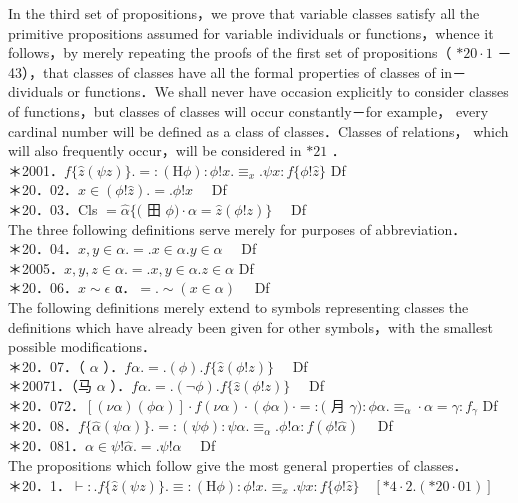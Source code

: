 \documentclass[10pt]{article}
\begin{document}
In the third set of propositions，we prove that variable classes satisfy all the primitive propositions assumed for variable individuals or functions，whence it follows，by merely repeating the proofs of the first set of propositions（ $* 20 \cdot 1$ －43），that classes of classes have all the formal properties of classes of in－ dividuals or functions．We shall never have occasion explicitly to consider classes of functions，but classes of classes will occur constantly－for example， every cardinal number will be defined as a class of classes．Classes of relations， which will also frequently occur，will be considered in $* 21$ ．\\
＊2001．$f\{\hat{z}(\psi z)\} .=:(\mathrm{H} \phi): \phi!x . \equiv_{x} . \psi x: f\{\phi!\hat{z}\}$ Df\\
＊20．02．$x \in(\phi!\hat{z}) .=. \phi!x \quad$ Df\\
＊20．03．Cls $=\hat{\alpha}\{($ 田 $\phi) \cdot \alpha=\hat{z}(\phi!z)\} \quad$ Df\\
The three following definitions serve merely for purposes of abbreviation．\\
＊20．04．$x, y \in \alpha .=. x \in \alpha . y \in \alpha \quad$ Df\\
＊2005．$x, y, z \in \alpha .=. x, y \in \alpha . z \in \alpha$ Df\\
＊20．06．$x \sim \epsilon$ α．$=. \sim(x \in \alpha) \quad$ Df\\
The following definitions merely extend to symbols representing classes the definitions which have already been given for other symbols，with the smallest possible modifications．\\
＊20．07．（ $\alpha$ ）．$f \alpha .=.(\phi) . f\{\hat{z}(\phi!z)\} \quad$ Df\\
＊20071．（马 $\alpha$ ）．$f \alpha .=.(\neg \phi) . f\{\hat{z}(\phi!z)\} \quad$ Df\\
＊20．072．$[(\nu \alpha)(\phi \alpha)] \cdot f(\nu \alpha) \cdot(\phi \alpha) \cdot=:($ 月 $\gamma): \phi \alpha . \equiv_{\alpha} \cdot \alpha=\gamma: f_{\gamma}$ Df\\
＊20．08．$f\{\hat{\alpha}(\psi \alpha)\} .=:(\psi \phi): \psi \alpha . \equiv_{\alpha} . \phi!\alpha: f(\phi!\hat{\alpha}) \quad$ Df\\
＊20．081．$\alpha \in \psi!\hat{\alpha} .=. \psi!\alpha \quad$ Df\\
The propositions which follow give the most general properties of classes．\\
＊20．1．$\vdash: . f\{\hat{z}(\psi z)\} . \equiv:(\mathrm{H} \phi): \phi!x . \equiv_{x} . \psi x: f\{\phi!\hat{z}\} \quad[* 4 \cdot 2 .(* 20 \cdot 01)]$\\
\end{document}
